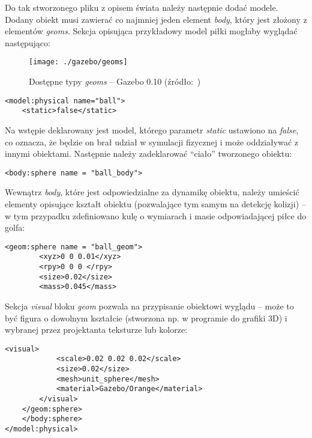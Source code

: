 	Do tak stworzonego pliku z opisem świata należy następnie dodać modele.  Dodany obiekt musi zawierać co najmniej jeden element \textit{body}, który jest złożony z elementów \textit{geoms}. Sekcja opisująca przykładowy model piłki mogłaby wyglądać następująco:
	\begin{figure}[H]
	\centering
	\texttt{[image: ./gazebo/geoms]}
	\caption[Dostępne typy \textit{geoms}]
		{\label{fig:geoms}Dostępne typy \textit{geoms} -- Gazebo 0.10 (źródło:~\cite{gazebo_experts})}
	\end{figure}
	
\begin{lstlisting}[name=gazebo_przyklad_pilka]
<model:physical name="ball">
    <static>false</static>
\end{lstlisting}
Na wstępie deklarowany jest model, którego parametr \textit{static} ustawiono na \textit{false}, co oznacza, że będzie on brał udział
w symulacji fizycznej i może oddziaływać z innymi obiektami. Następnie należy zadeklarować ``ciało'' tworzonego obiektu:
\begin{lstlisting}[name=gazebo_przyklad_pilka]
    <body:sphere name = "ball_body">	
\end{lstlisting}
Wewnątrz \textit{body}, które jest odpowiedzialne za dynamikę obiektu, należy umieścić elementy opisujące kształt obiektu (pozwalające tym samym na detekcję kolizji) -- w tym przypadku zdefiniowano kulę o wymiarach i masie odpowiadającej piłce do golfa:
\begin{lstlisting}[name=gazebo_przyklad_pilka]
	<geom:sphere name = "ball_geom">
		<xyz>0 0 0.01</xyz>
		<rpy>0 0 0 </rpy>
		<size>0.02</size>
		<mass>0.045</mass>
\end{lstlisting}
Sekcja \textit{visual} bloku \textit{geom} pozwala na przypisanie obiektowi wyglądu -- może to być figura o dowolnym kształcie (stworzona np. w programie do grafiki 3D) i wybranej przez projektanta teksturze lub kolorze:
\begin{lstlisting}[name=gazebo_przyklad_pilka]
		<visual>	
			<scale>0.02 0.02 0.02</scale>
			<size>0.02</size>
			<mesh>unit_sphere</mesh>
			<material>Gazebo/Orange</material>
		</visual>
	</geom:sphere>				
    </body:sphere>
</model:physical>
\end{lstlisting}	


